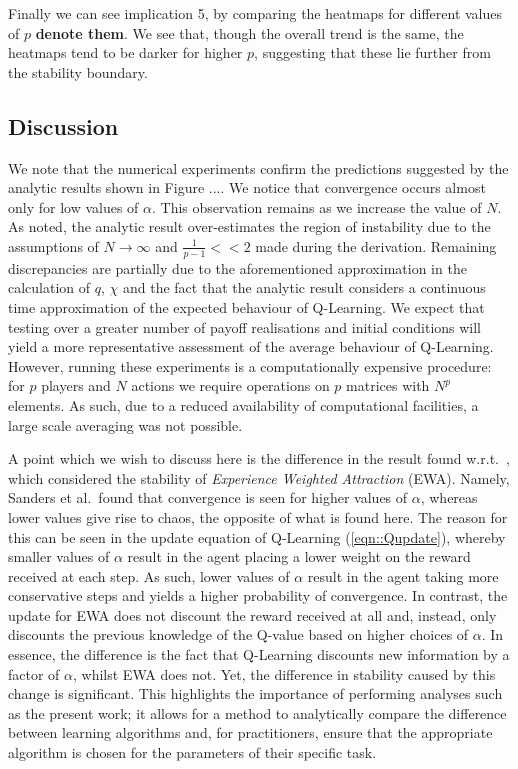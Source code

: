 \documentclass[sigconf,anonymous]{aamas}
\begin{document}
Finally we can see implication 5, by comparing the heatmaps for different values of $p$ \textbf{denote them}. We see that, though the overall trend is the same, the heatmaps tend to be darker for higher $p$, suggesting that these lie further from the stability boundary.


\subsection{Discussion}

We note that the numerical experiments confirm the predictions
suggested by the analytic results shown in Figure .... We notice that
convergence occurs almost only for low values of $\alpha$. This
observation remains as we increase the value of $N$. As noted, the
analytic result over-estimates the region of instability due to the
assumptions of $N \rightarrow \infty$ and $\frac{1}{p-1} << 2$ made
during the derivation. Remaining discrepancies are partially due to
the aforementioned approximation in the calculation of $q$, $\chi$ and
the fact that the analytic result considers a continuous time
approximation of the expected behaviour of Q-Learning. We expect that
testing over a greater number of payoff realisations and initial
conditions will yield a more representative assessment of the average
behaviour of Q-Learning. However, running these experiments is a
computationally expensive procedure: for $p$ players and $N$ actions
we require operations on $p$ matrices with $N^{p}$ elements. As such,
due to a reduced availability of computational facilities, a large
scale averaging was not possible.

A point which we wish to discuss here is the difference in the result
found w.r.t.~\cite{Sanders2018}, which considered the stability of
\textit{Experience Weighted Attraction} (EWA). Namely, Sanders et
al.~found that convergence is seen for higher values of $\alpha$,
whereas lower values give rise to chaos, the opposite of what is found
here. The reason for this can be seen in the update equation of
Q-Learning (\ref{eqn::Qupdate}), whereby smaller values of $\alpha$
result in the agent placing a lower weight on the reward received at
each step. As such, lower values of $\alpha$ result in the agent
taking more conservative steps and yields a higher probability of
convergence. In contrast, the update for EWA does not discount the
reward received at all and, instead, only discounts the previous
knowledge of the Q-value based on higher choices of $\alpha$. In
essence, the difference is the fact that Q-Learning discounts new
information by a factor of $\alpha$, whilst EWA does not. Yet, the
difference in stability caused by this change is significant. This
highlights the importance of performing analyses such as the present
work; it allows for a method to analytically compare the difference
between learning algorithms and, for practitioners, ensure that the
appropriate algorithm is chosen for the parameters of their specific
task.
\end{document}
